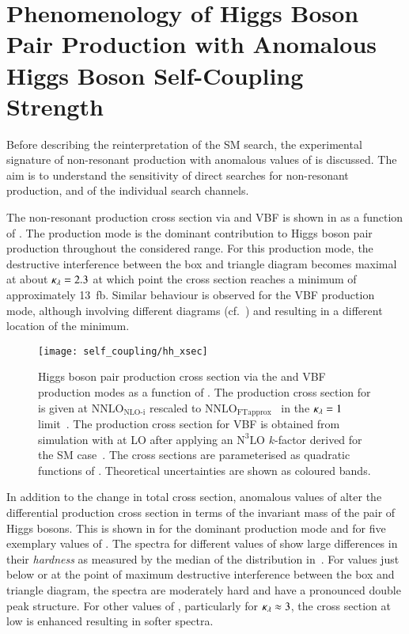 \section{Phenomenology of Higgs Boson Pair Production with Anomalous
  Higgs Boson Self-Coupling Strength}%
\label{sec:self_coupling_pheno}

Before describing the reinterpretation of the SM \HH search, the
experimental signature of non-resonant \HH production with anomalous
values of \klambda is discussed. The aim is to understand the
sensitivity of direct searches for non-resonant \HH production, and of
the individual search channels.

The non-resonant \HH production cross section via \ggF and VBF is
shown in  as a function of \klambda. The \ggF
production mode is the dominant contribution to Higgs boson pair
production throughout the considered \klambda range. For this
production mode, the destructive interference between the box and
triangle diagram becomes maximal at about $\kappa_{\lambda} = 2.3$ at which
point the cross section reaches a minimum of approximately
\SI{13}{\femto\barn}. Similar behaviour is observed for the VBF
production mode, although involving different diagrams (cf.\
) and resulting in a
different location of the minimum.

\begin{figure}[htbp]
  \centering

  \texttt{[image: self\_coupling/hh\_xsec]}

  \caption{Higgs boson pair production cross section via the \ggF and
    VBF production modes as a function of \klambda. The production
    cross section for \ggF is given at $\text{NNLO}_{\text{NLO-i}}$
    rescaled to
    $\text{NNLO}_{\text{FTapprox}}$~\cite{Grazzini:2018bsd} in the
    $\kappa_{\lambda} = 1$
    limit~\cite{Amoroso:2020lgh,Baglio:2020wgt,LHCHWGHH}. The
    production cross section for VBF is obtained from simulation with
    \MGNLO at LO after applying an $\text{N}^3\text{LO}$ $k$-factor
    derived for the SM case~\cite{Dreyer:2018qbw,LHCHWGHH}. The cross
    sections are parameterised as quadratic functions of
    \klambda. Theoretical uncertainties are shown as coloured bands.}%
  \label{fig:hh_xsec_incl}
\end{figure}

In addition to the change in total cross section, anomalous values of
\klambda alter the differential \HH production cross section in terms
of the invariant mass of the pair of Higgs bosons. This is shown in
\Cref{fig:hh_xsec_mhh} for the dominant \ggF production mode and for
five exemplary values of \klambda. The \mHH spectra for different
values of \klambda show large differences in their \emph{hardness} as
measured by the median of the \mHH distribution
in~. For \klambda values just below or at the
point of maximum destructive interference between the box and triangle
diagram, the \mHH spectra are moderately hard and have a pronounced
double peak structure. For other values of \klambda, particularly for
$\kappa_{\lambda} \approx 3$, the cross section at low \mHH is enhanced
resulting in softer \mHH spectra.

